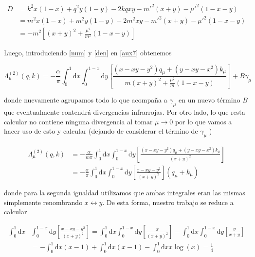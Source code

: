 \documentclass[tickz]{article}
\numberwithin{equation}{section}
\begin{document}
\begin{equation}\label{den}
\begin{aligned}
D&= k^2x(1-x) +q^2y(1-y) -2kqxy -m'^2(x+y) -\mu'^2(1-x-y)\\
&=m^2x(1-x) +m^2y(1-y) -2m^2xy -m'^2(x+y) -\mu'^2(1-x-y)\\
&=-m^2\left[(x+y)^2 + \frac{\mu^2}{m^2}(1-x-y)\right]
\end{aligned}
\end{equation}

Luego, introduciendo \ref{num} y \ref{den} en \ref{aux7} obtenemos

\begin{equation}\label{key}
\Lambda^{(2)}_{\mu}(q,k)=-\frac{\alpha}{\pi}\int_0^1\mathrm{d}x\int_0^{1-x}\mathrm{d}y \left[ \frac{  \left(x-xy-y^2\right)q_{\mu} + \left(y-xy-x^2\right)k_{\mu}}{m\left(x+y\right)^2 + \frac{\mu^2}{m} \left(1-x-y\right)}\right] + B\gamma_{\mu}
\end{equation}

donde nuevamente agrupamos todo lo que acompaña a $ \gamma_{\mu} $ en un nuevo término $ B $ que eventualmente contendrá divergencias infrarrojas. Por otro lado, lo que resta calcular no contiene ninguna divergencia al tomar $ \mu \longrightarrow 0 $ por lo que vamos a hacer uso de esto y calcular (dejando de considerar el término de $ \gamma_{\mu} $ )

\begin{equation}\label{key}
\begin{aligned}
\Lambda^{(2)}_{\mu}(q,k)&=-\frac{\alpha}{m\pi}\int_0^1\mathrm{d}x\int_0^{1-x}\mathrm{d}y \left[ \frac{  \left(x-xy-y^2\right)q_{\mu} + \left(y-xy-x^2\right)k_{\mu}}{\left(x+y\right)^2}\right]\\
&=-\frac{\alpha}{\pi}\int_0^1\mathrm{d}x\int_0^{1-x}\mathrm{d}y \left[ \frac{  x-xy-y^2}{\left(x+y\right)^2}\right] \left(q_{\mu} + k_{\mu}\right)
\end{aligned}
\end{equation}

donde para la segunda igualdad utilizamos que ambas integrales eran las mismas simplemente renombrando $ x \leftrightarrow y $. De esta forma, nuestro trabajo se reduce a calcular

\begin{equation}\label{key}
\begin{aligned}
\int_0^1\mathrm{d}x&\int_0^{1-x}\mathrm{d}y \left[ \frac{x-xy-y^2}{\left(x+y\right)^2}\right] = \int_0^1\mathrm{d}x\int_0^{1-x}\mathrm{d}y \left[ \frac{x}{\left(x+y\right)^2}\right] - \int_0^1\mathrm{d}x\int_0^{1-x}\mathrm{d}y \left[ \frac{y}{x+y}\right]\\
&= -\int_0^1\mathrm{d}x (x-1) + \int_0^1\mathrm{d}x (x-1) - \int_0^1\mathrm{d}x x \log(x)= \frac{1}{4}
\end{aligned}
\end{equation}
\end{document}
